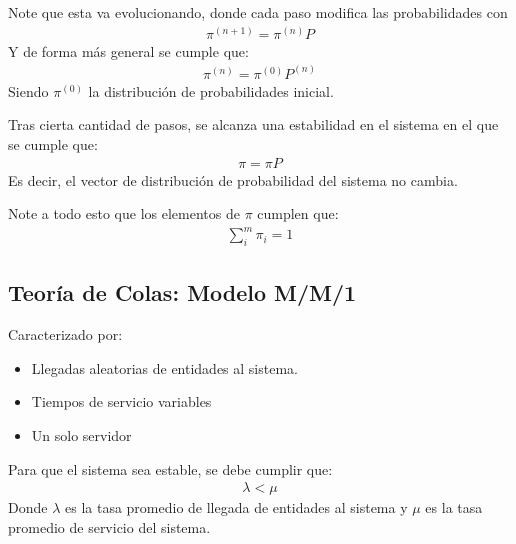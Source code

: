Note que esta va evolucionando, donde cada paso modifica las probabilidades con
\begin{align*}
    \pi^{(n+1)} = \pi^{(n)} P
\end{align*}
Y de forma más general se cumple que:
\begin{align*}
    \pi^{(n)} = \pi^{(0)} P^{(n)}
\end{align*}
Siendo $\pi^{(0)}$ la distribución de probabilidades inicial.

Tras cierta cantidad de pasos, se alcanza una estabilidad en el sistema en el que se cumple que:
\begin{align*}
    \pi = \pi P
\end{align*}
Es decir, el vector de distribución de probabilidad del sistema no cambia.

Note a todo esto que los elementos de $\pi$ cumplen que:
\begin{align*}
    \sum_i^m \pi_i = 1
\end{align*}

\subsection{Teoría de Colas: Modelo M/M/1}

Caracterizado por:
\begin{itemize}
    \item Llegadas aleatorias de entidades al sistema.
    \item Tiempos de servicio variables
    \item Un solo servidor
\end{itemize}

Para que el sistema sea estable, se debe cumplir que:
\begin{align*}
    \lambda < \mu
\end{align*}
Donde $\lambda$ es la tasa promedio de llegada de entidades al sistema y $\mu$ es la tasa promedio de servicio del sistema.


